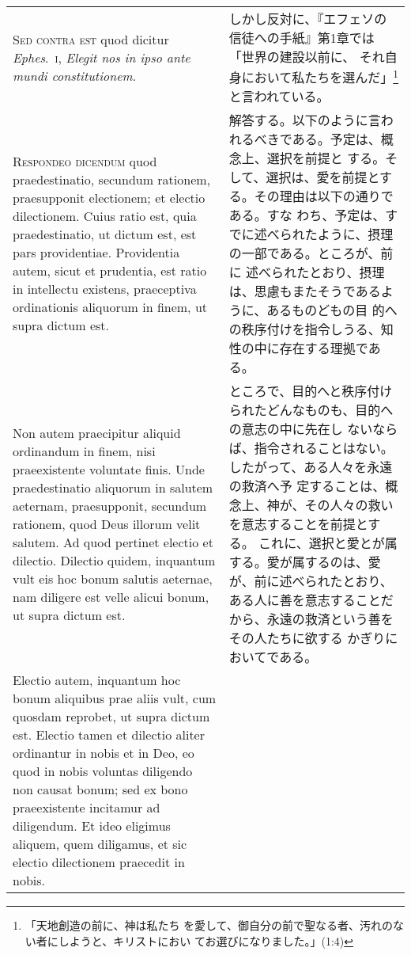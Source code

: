 \documentclass[10pt]{jsarticle} %
\begin{document}
\begin{longtable}{p{21em}p{21em}}
{\scshape Sed contra est} quod dicitur {\itshape Ephes}.~{\scshape i}, {\itshape Elegit
 nos in ipso ante mundi constitutionem}.


&

しかし反対に、『エフェソの信徒への手紙』第1章では「世界の建設以前に、
それ自身において私たちを選んだ」\footnote{「天地創造の前に、神は私たち
を愛して、御自分の前で聖なる者、汚れのない者にしようと、キリストにおい
てお選びになりました。」(1:4)}と言われている。

\\



{\scshape Respondeo dicendum} quod praedestinatio,
 secundum rationem, praesupponit electionem; et electio
 dilectionem. Cuius ratio est, quia praedestinatio, ut dictum est, est
 pars providentiae. Providentia autem, sicut et prudentia, est ratio in
 intellectu existens, praeceptiva ordinationis aliquorum in finem, ut
 supra dictum est. 


&

解答する。以下のように言われるべきである。予定は、概念上、選択を前提と
する。そして、選択は、愛を前提とする。その理由は以下の通りである。すな
わち、予定は、すでに述べられたように、摂理の一部である。ところが、前に
述べられたとおり、摂理は、思慮もまたそうであるように、あるものどもの目
的への秩序付けを指令しうる、知性の中に存在する理拠である。


\\


Non autem praecipitur aliquid ordinandum in finem,
 nisi praeexistente voluntate finis. Unde praedestinatio aliquorum in
 salutem aeternam, praesupponit, secundum rationem, quod Deus illorum
 velit salutem. Ad quod pertinet electio et dilectio. Dilectio quidem,
 inquantum vult eis hoc bonum salutis aeternae, nam diligere est velle
 alicui bonum, ut supra dictum est. 



&


ところで、目的へと秩序付けられたどんなものも、目的への意志の中に先在し
ないならば、指令されることはない。したがって、ある人々を永遠の救済へ予
定することは、概念上、神が、その人々の救いを意志することを前提とする。
これに、選択と愛とが属する。愛が属するのは、愛が、前に述べられたとおり、
ある人に善を意志することだから、永遠の救済という善をその人たちに欲する
かぎりにおいてである。

\\


Electio autem, inquantum hoc bonum
 aliquibus prae aliis vult, cum quosdam reprobet, ut supra dictum
 est. Electio tamen et dilectio aliter ordinantur in nobis et in Deo, eo
 quod in nobis voluntas diligendo non causat bonum; sed ex bono
 praeexistente incitamur ad diligendum. Et ideo eligimus aliquem, quem
 diligamus, et sic electio dilectionem praecedit in nobis. 



\end{longtable}
\end{document}
